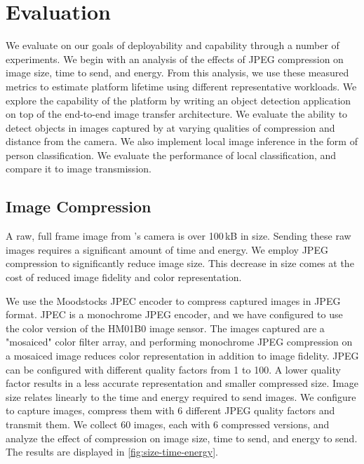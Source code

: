 \section{Evaluation}
We evaluate \name{} on our goals of deployability and capability through a number of experiments. We begin with an analysis of the effects of JPEG compression on image size, time to send, and energy. From this analysis, we use these measured metrics to estimate platform lifetime using different representative workloads. 
We explore the capability of the platform by writing an object detection application on top of the \name{} end-to-end image transfer architecture. We evaluate the ability to detect objects in images captured by \name{} at varying qualities of compression and distance from the camera. We also implement local image inference in the form of person classification. We evaluate the performance of local classification, and compare it to image transmission.

\subsection{Image Compression}
\label{eval:compression}
A raw, full frame image from \name{}'s camera is over 100\,kB in size. Sending these raw images requires a significant amount of time and energy. We employ JPEG compression to significantly reduce image size. This decrease in size comes at the cost of reduced image fidelity and color representation.

We use the Moodstocks JPEC encoder to compress captured images in JPEG format. JPEC is a monochrome JPEG encoder, and we have configured \name{} to use the color version of the HM01B0 image sensor. The images captured are a "mosaiced" color filter array, and performing monochrome JPEG compression on a mosaiced image reduces color representation in addition to image fidelity. JPEG can be configured with different quality factors from 1 to 100. A lower quality factor results in a less accurate representation and smaller compressed size. Image size relates linearly to the time and energy required to send images. 
We configure \name to capture images, compress them with 6 different JPEG quality factors and transmit them. We collect 60 images, each with 6 compressed versions, and analyze the effect of compression on image size, time to send, and energy to send.
The results are displayed in \cref{fig:size-time-energy}. 

